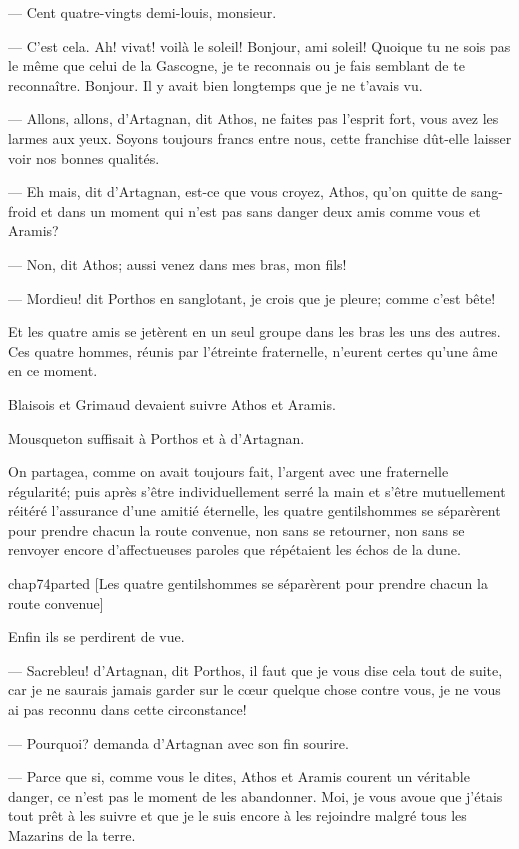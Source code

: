 — Cent quatre-vingts demi-louis, monsieur.

— C'est cela. Ah! vivat! voilà le soleil! Bonjour, ami soleil! Quoique tu ne sois pas le même que celui de la Gascogne, je te reconnais ou je fais semblant de te reconnaître. Bonjour. Il y avait bien longtemps que je ne t'avais vu.

— Allons, allons, d'Artagnan, dit Athos, ne faites pas l'esprit fort, vous avez les larmes aux yeux. Soyons toujours francs entre nous, cette franchise dût-elle laisser voir nos bonnes qualités.

— Eh mais, dit d'Artagnan, est-ce que vous croyez, Athos, qu'on quitte de sang-froid et dans un moment qui n'est pas sans danger deux amis comme vous et Aramis?

— Non, dit Athos; aussi venez dans mes bras, mon fils!

— Mordieu! dit Porthos en sanglotant, je crois que je pleure; comme c'est bête!

Et les quatre amis se jetèrent en un seul groupe dans les bras les uns des autres. Ces quatre hommes, réunis par l'étreinte fraternelle, n'eurent certes qu'une âme en ce moment.

Blaisois et Grimaud devaient suivre Athos et Aramis.

Mousqueton suffisait à Porthos et à d'Artagnan.

On partagea, comme on avait toujours fait, l'argent avec une fraternelle régularité; puis après s'être individuellement serré la main et s'être mutuellement réitéré l'assurance d'une amitié éternelle, les quatre gentilshommes se séparèrent pour prendre chacun la route convenue, non sans se retourner, non sans se renvoyer encore d'affectueuses paroles que répétaient les échos de la dune.

\begin{bwbigpic}
	[\basicscale] 
	{chap74parted}
	[Les quatre gentilshommes se séparèrent pour prendre chacun la route convenue]
\end{bwbigpic}

Enfin ils se perdirent de vue.

— Sacrebleu! d'Artagnan, dit Porthos, il faut que je vous dise cela tout de suite, car je ne saurais jamais garder sur le cœur quelque chose contre vous, je ne vous ai pas reconnu dans cette circonstance!

— Pourquoi? demanda d'Artagnan avec son fin sourire.

— Parce que si, comme vous le dites, Athos et Aramis courent un véritable danger, ce n'est pas le moment de les abandonner. Moi, je vous avoue que j'étais tout prêt à les suivre et que je le suis encore à les rejoindre malgré tous les Mazarins de la terre.


